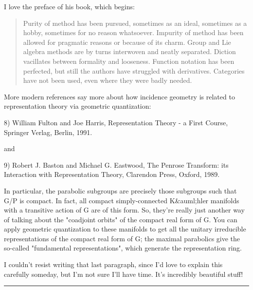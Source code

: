 I love the preface of his book, which begins:

\begin{quote}
     Purity of method has been pursued, sometimes as an ideal, sometimes
     as a hobby, sometimes for no reason whatsoever.  Impurity of method
     has been allowed for pragmatic reasons or because of its charm.
     Group and Lie algebra methods are by turns interwoven and neatly
     separated.  Diction vacillates between formality and looseness.
     Function notation has been perfected, but still the authors have
     struggled with derivatives.  Categories have not been used, even 
     where they were badly needed.
\end{quote}
More modern references say more about how incidence geometry is
related to representation theory via geometric quantization:

8)  William Fulton and Joe Harris, Representation Theory - a First
Course, Springer Verlag, Berlin, 1991.

and 

9) Robert J. Baston and Michael G. Eastwood, The Penrose Transform:
its Interaction with Representation Theory, Clarendon Press, Oxford,
1989.

In particular, the parabolic subgroups are precisely those subgroups
such that G/P is compact.  In fact, all compact simply-connected K&auml;hler
manifolds with a transitive action of G are of this form.  So, they're
really just another way of talking about the "coadjoint
orbits" of the compact real form of G.  You can apply geometric
quantization to these manifolds to get all the unitary irreducible
representations of the compact real form of G; the maximal parabolics
give the so-called "fundamental representations", which
generate the representation ring.

I couldn't resist writing that last paragraph, since I'd love to 
explain this carefully someday, but I'm not sure I'll have time.
It's incredibly beautiful stuff!

\par\noindent\rule{\textwidth}{0.4pt}
